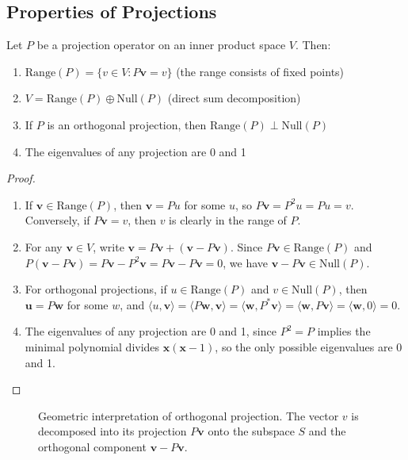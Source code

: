 \documentclass[../../main.tex]{subfiles}
\begin{document}
\subsection{Properties of Projections}
Let $P$ be a projection operator on an inner product space $V$. Then:
\begin{enumerate}
    \item $\text{Range}(P) = \{v  \in  V : P\mathbf{v} = v\}$ (the range consists of fixed points)
    \item $V = \text{Range}(P) \oplus \text{Null}(P)$ (direct sum decomposition)
    \item If $P$ is an orthogonal projection, then $\text{Range}(P) \perp \text{Null}(P)$
    \item The eigenvalues of any projection are 0 and 1
\end{enumerate}
\begin{proof}
    \begin{enumerate}
        \item If $\mathbf{v} \in \text{Range}(P)$, then $\mathbf{v} = Pu$ for some $u$, so $P\mathbf{v} = P^2u = Pu = v$. Conversely, if $P\mathbf{v} = v$, then $v$ is clearly in the range of $P$.
        \item For any $\mathbf{v} \in V$, write $\mathbf{v} = P\mathbf{v} + (\mathbf{v} - P\mathbf{v})$. Since $P\mathbf{v}  \in  \text{Range}(P)$ and $P(\mathbf{v} - P\mathbf{v}) = P\mathbf{v} - P^2 \mathbf{v} = P\mathbf{v} - P\mathbf{v} = 0$, we have $\mathbf{v} - P\mathbf{v}  \in  \text{Null}(P)$.
        \item For orthogonal projections, if $u  \in  \text{Range}(P)$ and $v  \in  \text{Null}(P)$, then $\mathbf{u} =P\mathbf{w}$ for some $w$, and $\langle u, \mathbf{v} \rangle = \langle P\mathbf{w}, \mathbf{v} \rangle = \langle \mathbf{w}, P^{\ast} \mathbf{v} \rangle = \langle \mathbf{w}, P\mathbf{v} \rangle = \langle \mathbf{w}, 0 \rangle = 0$.
        \item The eigenvalues of any projection are 0 and 1, since $P^2 = P$ implies the minimal polynomial divides $\mathbf{x}(\mathbf{x}-1)$, so the only possible eigenvalues are 0 and 1.
    \end{enumerate}
\end{proof}

\begin{figure}[ht]
    \centering
    
    \caption{Geometric interpretation of orthogonal projection. The vector $v$ is decomposed into its projection $P\mathbf{v}$ onto the subspace $S$ and the orthogonal component $\mathbf{v} - P\mathbf{v}$.}
    \label{fig:orthogonal-projection}
\end{figure}
\end{document}
